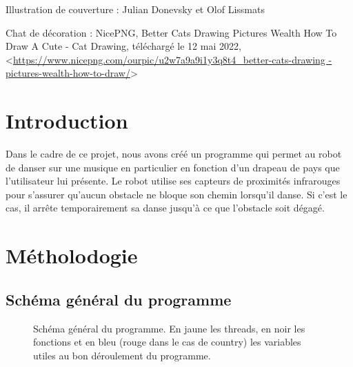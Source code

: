 \documentclass{article}
\begin{document}
    \thispagestyle{empty}

    \tableofcontents
    
    \vfill
    
    \noindent Illustration de couverture : Julian Donevsky et Olof Lissmats
    
    \noindent Chat de décoration : NicePNG, Better Cats Drawing Pictures Wealth How To Draw A Cute - Cat Drawing, téléchargé le 12 mai 2022, <\url{https://www.nicepng.com/ourpic/u2w7a9a9i1y3q8t4_better-cats-drawing -pictures-wealth-how-to-draw/}>

    \newpage

    \setcounter{page}{1}

    \section{Introduction}

    Dans le cadre de ce projet, nous avons créé un programme qui permet au robot de danser sur une musique en particulier en fonction d'un drapeau de pays que l'utilisateur lui présente.
    Le robot utilise ses capteurs de proximités infrarouges pour s'assurer qu'aucun obstacle ne bloque son chemin lorsqu'il danse. 
    Si c'est le cas, il arrête temporairement sa danse jusqu'à ce que l'obstacle soit dégagé.

    \section{Métholodogie}
    
    \subsection{Schéma général du programme}
    \begin{figure}[!ht]
        \noindent{}
        \caption{Schéma général du programme. En jaune les threads, en noir les fonctions et en bleu (rouge dans le cas de country) les variables utiles au bon déroulement du programme.}
        \label{fig:structure} %
    \end{figure}
\end{document}
